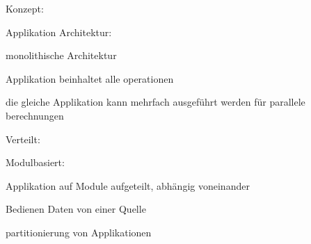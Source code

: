 \begin{notes}
    \item Konzept: \cite{Mahmud2020}
    \begin{notes}
        \item Applikation Architektur:
        \begin{notes}
            \item monolithische Architektur
            \begin{notes}
                \item Applikation beinhaltet alle operationen
                \item die gleiche Applikation kann mehrfach ausgeführt werden für parallele berechnungen
            \end{notes}
            \item Verteilt:
            \begin{notes}
                \item Modulbasiert:

                    \item Applikation auf Module aufgeteilt, abhängig voneinander
                    \item Bedienen Daten von einer Quelle
                    \item partitionierung von Applikationen \cite{Ashraf2022}
 

\end{notes}
\end{notes}
\end{notes}
\end{notes}
